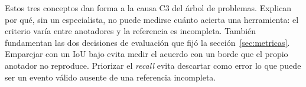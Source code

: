 Estos tres conceptos dan forma a la causa C3 del árbol de problemas. Explican por
qué, sin un especialista, no puede medirse cuánto acierta una herramienta: el
criterio varía entre anotadores y la referencia es incompleta. También fundamentan las dos
decisiones de evaluación que fijó la sección~\ref{sec:metricas}. Emparejar con un
IoU bajo evita medir el acuerdo con un borde que el propio anotador no reproduce.
Priorizar el \textit{recall} evita descartar como error lo que puede ser un evento
válido ausente de una referencia incompleta.

